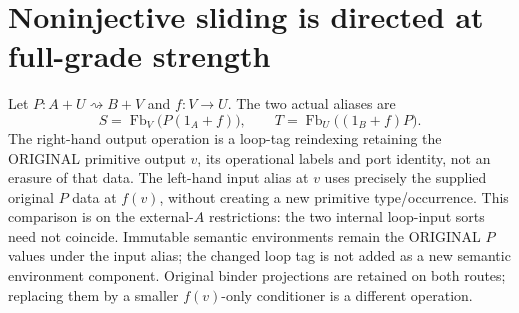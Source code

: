\documentclass[11pt]{article}
\begin{document}
\section{Noninjective sliding is directed at full-grade strength}
Let $P:A+U\rightsquigarrow B+V$ and $f:V\to U$. The two actual aliases are
\[
 S=\operatorname{Fb}_V\big(P(1_A+f)\big),\qquad
 T=\operatorname{Fb}_U\big((1_B+f)P\big).
\]
The right-hand output operation is a loop-tag reindexing retaining the ORIGINAL primitive output $v$, its operational labels and port identity, not an erasure of that data. The left-hand input alias at $v$ uses precisely the supplied original $P$ data at $f(v)$, without creating a new primitive type/occurrence. This comparison is on the external-$A$ restrictions: the two internal loop-input sorts need not coincide. Immutable semantic environments remain the ORIGINAL $P$ values under the input alias; the changed loop tag is not added as a new semantic environment component. Original binder projections are retained on both routes; replacing them by a smaller $f(v)$-only conditioner is a different operation.
\end{document}
